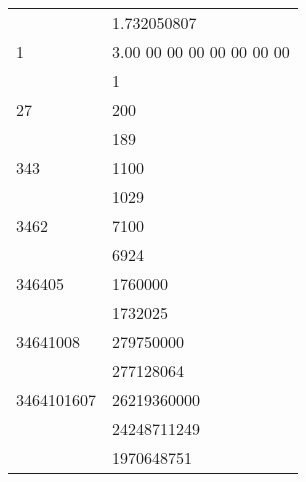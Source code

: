 \documentclass[a4paper]{article}
\begin{document}
\begin{center}
\begin{tabular}{l|l } 
 
       & 1.732050807\\\cline{2-2}
1      &3.00 00 00 00 00 00 00 00 \\
       & 1 \\\cline{2-2} 
27     & 200\\ 
       &{\hspace{2mm}189}\\\cline{2-2} 
343     &{\hspace{4mm}1100}\\
       &{\hspace{4mm}1029}\\\cline{2-2}
3462   &{\hspace{8mm}7100}\\
       &{\hspace{8mm}6924}\\\cline{2-2} 
346405  &{\hspace{8mm}1760000}\\ 
       &{\hspace{8mm}1732025}\\\cline{2-2} 
34641008 &{\hspace{12mm}279750000}\\ 
       &{\hspace{12mm}277128064}\\\cline{2-2}
3464101607&{\hspace{16mm}26219360000}\\ 
       &{\hspace{16mm}24248711249}\\\cline{2-2}
       &{\hspace{18mm}1970648751}\\
                                   
\end{tabular}
\end{center}
\end{document}
